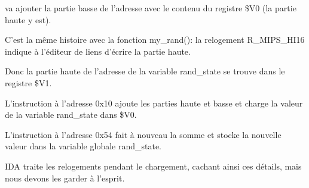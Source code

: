 \SW va ajouter la partie basse de l'adresse avec le contenu du registre \$V0 (la
partie haute y est).

C'est la même histoire avec la fonction my\_rand(): la relogement R\_MIPS\_HI16 indique
à l'éditeur de liens d'écrire la partie haute.

Donc la partie haute de l'adresse de la variable rand\_state se trouve dans le registre
\$V1.

L'instruction \LW à l'adresse 0x10 ajoute les parties haute et basse et charge la
valeur de la variable rand\_state dans \$V0.

L'instruction \SW à l'adresse 0x54 fait à nouveau la somme et stocke la nouvelle
valeur dans la variable globale rand\_state.

IDA traite les relogements pendant le chargement, cachant ainsi ces détails, mais
nous devons les garder à l'esprit.

